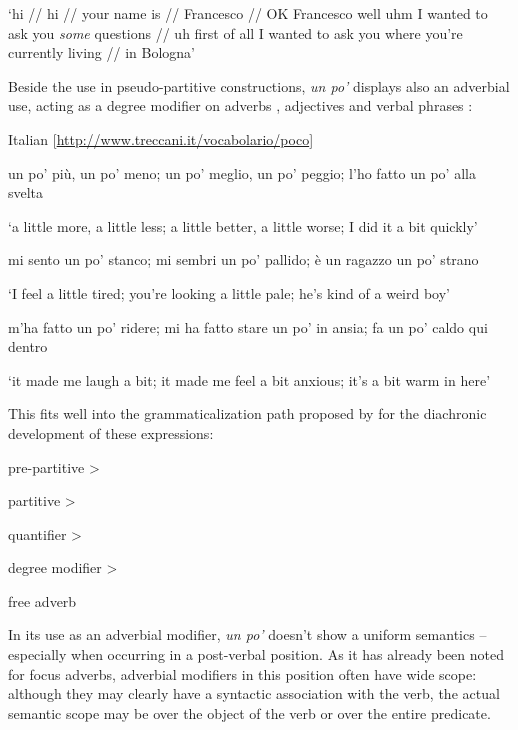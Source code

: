 \glt ‘hi // hi // your name is // Francesco // OK Francesco well uhm I wanted to ask you \textit{some} questions // uh first of all I wanted to ask you where you’re currently living // in Bologna’
    \z %

Beside the use in pseudo-partitive constructions, \textit{un po’} displays also an adverbial use, acting as a degree modifier on adverbs , adjectives  and verbal phrases :

\ea%
    \label{ex:key:54}

          Italian [\url{http://www.treccani.it/vocabolario/poco}]

\ea  \label{ex:key:54a} un po’ più, un po’ meno; un po’ meglio, un po’ peggio;    l’ho fatto un po’ alla svelta

\glt ‘a little more, a little less; a little better, a little worse; I did it a bit quickly’

\ex \label{ex:key:54b} mi sento un po’ stanco; mi sembri un po’ pallido; è un ragazzo un po’ strano

\glt ‘I feel a little tired; you’re looking a little pale; he’s kind of a weird boy’

\ex \label{ex:key:54c} m’ha fatto un po’ ridere; mi ha fatto stare un po’ in ansia; fa un po’ caldo qui dentro

\glt ‘it made me laugh a bit; it made me feel a bit anxious; it’s a bit warm in here’
    \z
\z

This fits well into the grammaticalization path proposed by \citet{Traugott2008} for the diachronic development of these expressions:

\ea%
    \label{ex:key:55}

           pre-partitive >

partitive >

quantifier >

degree modifier >

free adverb\footnotemark
\z
{}

In its use as an adverbial modifier, \textit{un po’} doesn’t show a uniform semantics – especially when occurring in a post-verbal position. As it has already been noted for focus adverbs, adverbial modifiers in this position often have wide scope: although they may clearly have a syntactic association with the verb, the actual semantic scope may be over the object of the verb or over the entire predicate.

